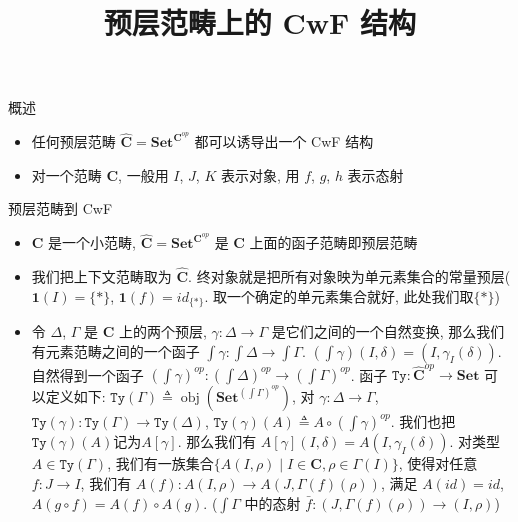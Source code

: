 \documentclass[aspectratio=169,xcolor=dvipsnames]{beamer}
\title{预层范畴上的 CwF 结构}
\date{}
\newcommand\Ty{\mathtt{Ty}}
\newcommand\bfone{\mathbf{1}}
\newcommand\Set{\mathbf{Set}}
\newcommand\C{\mathbf{C}}
\newcommand\hatC{\widehat{\mathbf{C}}}
\DeclareMathOperator\obj{obj}
\begin{document}
\begin{frame}
    \titlepage
\end{frame}

\begin{frame}{概述}
  \begin{itemize}
    \item 任何预层范畴 $\hatC = \Set^{\C^{op}}$ 都可以诱导出一个 CwF 结构
    \item 对一个范畴 $\C$, 一般用 $I$, $J$, $K$ 表示对象, 用 $f$, $g$, $h$ 表示态射
  \end{itemize}
\end{frame}

\begin{frame}[shrink]{预层范畴到 CwF}
\begin{itemize}
  \item $\C$ 是一个小范畴, $\hatC=\Set^{\C^{op}}$ 是 $\C$ 上面的函子范畴即预层范畴
  \item 我们把上下文范畴取为 $\hatC$. 终对象就是把所有对象映为单元素集合的常量预层($\bfone(I)=\{\ast\}$, $\bfone(f) = id_{\{\ast\}}$. 取一个确定的单元素集合就好, 此处我们取$\{\ast\}$)
  \item 令 $\Delta$, $\Gamma$ 是 $\C$ 上的两个预层, $\gamma:\Delta\to\Gamma$ 是它们之间的一个自然变换, 那么我们有元素范畴之间的一个函子 $\int\gamma:\int\Delta\to\int\Gamma$. $(\int\gamma)(I,\delta) = (I,\gamma_{I}(\delta))$. 自然得到一个函子 $(\int\gamma)^{op}:(\int\Delta)^{op}\to(\int\Gamma)^{op}$. 函子 $\Ty:\hatC^{op}\to\Set$ 可以定义如下: $\Ty(\Gamma) \triangleq \obj(\Set^{(\int\Gamma)^{op}})$, 对 $\gamma:\Delta\to\Gamma$, $\Ty(\gamma):\Ty(\Gamma)\to\Ty(\Delta)$, $\Ty(\gamma)(A) \triangleq A \circ (\int\gamma)^{op}$. 我们也把$\Ty(\gamma)(A)$记为$A[\gamma]$. 那么我们有 $A[\gamma](I,\delta) = A(I,\gamma_I(\delta))$. 对类型 $A\in\Ty(\Gamma)$, 我们有一族集合$\{A(I,\rho) \mid I\in\C, \rho\in\Gamma(I)\}$, 使得对任意 $f : J \to I$, 我们有 $A(f) : A(I,\rho) \to A(J,\Gamma(f)(\rho))$, 满足 $A(id) = id$, $A(g\circ f) = A(f) \circ A(g)$. ($\int\Gamma$ 中的态射 $\bar{f} : (J,\Gamma(f)(\rho)) \to (I, \rho)$)
\end{itemize}
\end{frame}
\end{document}
